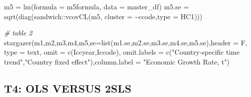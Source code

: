 \documentclass[
]{article}
\newenvironment{Shaded}{\begin{snugshade}}{\end{snugshade}}
\newcommand{\AttributeTok}[1]{\textcolor[rgb]{0.77,0.63,0.00}{#1}}
\newcommand{\CommentTok}[1]{\textcolor[rgb]{0.56,0.35,0.01}{\textit{#1}}}
\newcommand{\FunctionTok}[1]{\textcolor[rgb]{0.00,0.00,0.00}{#1}}
\newcommand{\NormalTok}[1]{#1}
\newcommand{\OtherTok}[1]{\textcolor[rgb]{0.56,0.35,0.01}{#1}}
\newcommand{\SpecialCharTok}[1]{\textcolor[rgb]{0.00,0.00,0.00}{#1}}
\newcommand{\StringTok}[1]{\textcolor[rgb]{0.31,0.60,0.02}{#1}}
\begin{document}
\begin{Shaded}
\begin{Highlighting}[]
\NormalTok{m5 }\OtherTok{=} \FunctionTok{lm}\NormalTok{(}\AttributeTok{formula =}\NormalTok{ m5formula, }\AttributeTok{data =}\NormalTok{ master\_df)}
\NormalTok{m5.se }\OtherTok{=} \FunctionTok{sqrt}\NormalTok{(}\FunctionTok{diag}\NormalTok{(sandwich}\SpecialCharTok{::}\FunctionTok{vcovCL}\NormalTok{(m5, }\AttributeTok{cluster =} \SpecialCharTok{\textasciitilde{}}\NormalTok{ccode,}\AttributeTok{type =} \StringTok{\textquotesingle{}HC1\textquotesingle{}}\NormalTok{)))}

\CommentTok{\# table 2}
\FunctionTok{stargazer}\NormalTok{(m1,m2,m3,m4,m5,}\AttributeTok{se=}\FunctionTok{list}\NormalTok{(m1.se,m2.se,m3.se,m4.se,m5.se),}\AttributeTok{header =}\NormalTok{ F, }\AttributeTok{type =} \StringTok{\textquotesingle{}text\textquotesingle{}}\NormalTok{, }\AttributeTok{omit =} \FunctionTok{c}\NormalTok{(}\StringTok{\textquotesingle{}Iccyear\textquotesingle{}}\NormalTok{,}\StringTok{\textquotesingle{}Iccode\textquotesingle{}}\NormalTok{), }\AttributeTok{omit.labels =} \FunctionTok{c}\NormalTok{(}\StringTok{"Country{-}speciﬁc time trend"}\NormalTok{,}\StringTok{"Country fixed effect"}\NormalTok{),}\AttributeTok{column.label =} \StringTok{"Economic Growth Rate, t"}\NormalTok{)}
\end{Highlighting}
\end{Shaded}

\hypertarget{t4-ols-versus-2sls}{%
\subsection{T4: OLS VERSUS 2SLS}\label{t4-ols-versus-2sls}}
\end{document}
